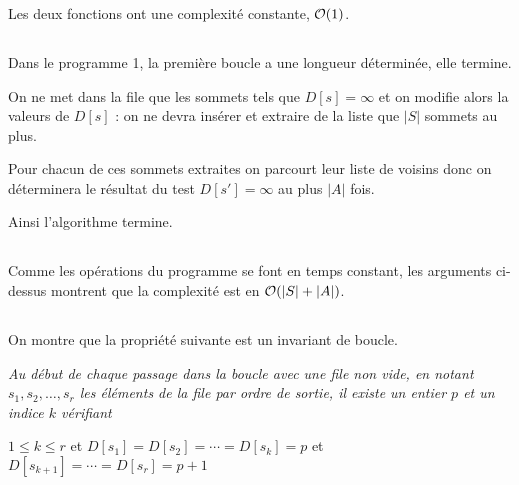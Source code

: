 \subsubsection{}
Les deux fonctions ont une complexité constante, ${\cal O}(1)$.
\subsection{}
Dans le programme 1, la première boucle a une longueur déterminée, elle termine.

On ne met dans la file que les sommets tels que $D[s] = \infty$ et on modifie alors la valeurs de $D[s]$ : on ne devra  insérer et extraire de la liste que $|S|$ sommets au plus.

Pour chacun de ces sommets extraites on parcourt leur liste de voisins donc on déterminera le résultat du test $D[s'] = \infty$ au plus $|A|$ fois.

Ainsi l'algorithme termine.
\subsection{}
Comme les opérations du programme se font en temps constant, les arguments ci-dessus montrent que la complexité est en ${\cal O}(|S|+|A|)$.
\subsection{}
On montre que la propriété suivante est un invariant de boucle.


{\it Au début de chaque passage dans la boucle avec une file non vide, en notant  $s_1,s_2,\ldots,s_r$ les éléments de la file par ordre de sortie, il existe un entier $p$ et un indice $k$ vérifiant 

$1\le k\le r$ et $D[s_1] = D[s_2]= \cdots= D[s_k]=p$ et $D[s_{k+1}] = \cdots= D[s_r]=p+1$}

